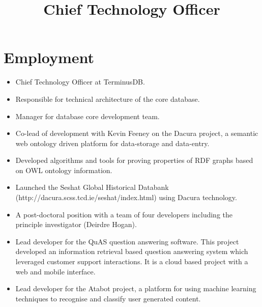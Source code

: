 \documentclass[a4paper,11pt]{moderncv}
\title{Chief Technology Officer}
\begin{document}
\maketitle

\section{Employment}

{
  \begin{itemize}
  \item Chief Technology Officer at TerminusDB.
  \item Responsible for technical architecture of the core database.
  \item Manager for database core development team.
  \end{itemize}
}

{
  \begin{itemize}
  \item Co-lead of development with Kevin Feeney on the Dacura project, a semantic web ontology driven platform for data-storage and data-entry.
  \item Developed algorithms and tools for proving properties of RDF graphs based on OWL ontology information.
  \item Launched the Seshat Global Historical Databank (http://dacura.scss.tcd.ie/seshat/index.html) using Dacura technology.
  \end{itemize}
}

{
  \begin{itemize}
  \item A post-doctoral position with a team of four developers including the principle investigator (Deirdre Hogan).
  \item Lead developer for the QuAS question answering software. This project developed an information retrieval based question answering system which leveraged customer support interactions. It is a cloud based project with a web and mobile interface.
  \item Lead developer for the Atabot project, a platform for using machine learning techniques to recognise and classify user generated content.
  \end{itemize}
}
\end{document}
